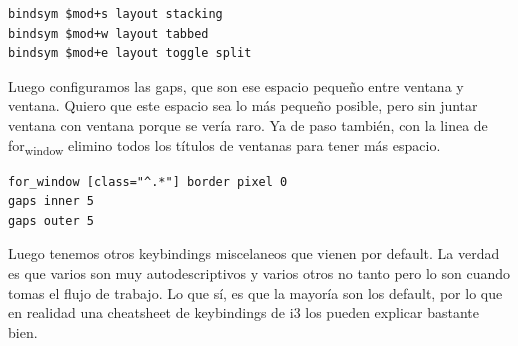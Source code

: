 \documentclass[11pt]{article}
\begin{document}
\begin{verbatim}
bindsym $mod+s layout stacking
bindsym $mod+w layout tabbed
bindsym $mod+e layout toggle split
\end{verbatim}

Luego configuramos las gaps, que son ese espacio pequeño entre ventana y ventana. Quiero que este espacio sea lo más pequeño posible, pero sin juntar ventana con ventana porque se vería raro. Ya de paso también, con la linea de for\textsubscript{window} elimino todos los títulos de ventanas para tener más espacio.

\begin{verbatim}
for_window [class="^.*"] border pixel 0
gaps inner 5
gaps outer 5
\end{verbatim}

Luego tenemos otros keybindings miscelaneos que vienen por default. La verdad es que varios son muy autodescriptivos y varios otros no tanto pero lo son cuando tomas el flujo de trabajo. Lo que sí, es que la mayoría son los default, por lo que en realidad una cheatsheet de keybindings de i3 los pueden explicar bastante bien.
\end{document}
